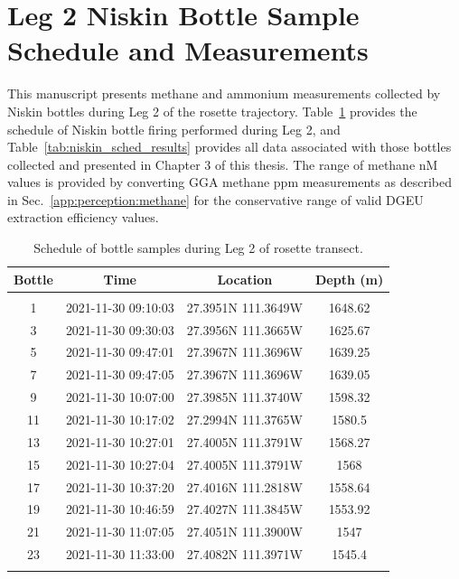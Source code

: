 \section{Leg 2 Niskin Bottle Sample Schedule and Measurements}
\label{app:perception:niskin}
This manuscript presents methane and ammonium measurements collected by Niskin bottles during Leg 2 of the rosette trajectory. Table~\ref{tab:niskin_sched} provides the schedule of Niskin bottle firing performed during Leg 2, and Table~\ref{tab:niskin_sched_results} provides all data associated with those bottles collected and presented in Chapter 3 of this thesis. The range of methane nM values is provided by converting GGA methane ppm measurements as described in Sec.~\ref{app:perception:methane} for the conservative range of valid DGEU extraction efficiency values.
\begin{table}[h!]
    \centering
    \begin{tabular}{c|c|c|c}
        Bottle & Time & Location & Depth (m) \\
        \hline
        \hline
        &&&\\
        1 & 2021-11-30 09:10:03 & 27.3951N 111.3649W & 1648.62 \\
        3 & 2021-11-30 09:30:03 & 27.3956N 111.3665W & 1625.67 \\
        5 & 2021-11-30 09:47:01 & 27.3967N 111.3696W & 1639.25 \\
        7 & 2021-11-30 09:47:05 & 27.3967N 111.3696W & 1639.05 \\
        9 & 2021-11-30 10:07:00 & 27.3985N 111.3740W & 1598.32 \\
        11 & 2021-11-30 10:17:02 & 27.2994N 111.3765W & 1580.5 \\
        13 & 2021-11-30 10:27:01 & 27.4005N 111.3791W & 1568.27 \\
        15 & 2021-11-30 10:27:04 & 27.4005N 111.3791W & 1568 \\
        17 & 2021-11-30 10:37:20 & 27.4016N 111.2818W & 1558.64 \\
        19 & 2021-11-30 10:46:59 & 27.4027N 111.3845W & 1553.92 \\
        21 & 2021-11-30 11:07:05 & 27.4051N 111.3900W & 1547 \\
        23 & 2021-11-30 11:33:00 & 27.4082N 111.3971W & 1545.4 \\
        &&&
    \end{tabular}
    \caption{Schedule of bottle samples during Leg 2 of rosette transect.}
    \label{tab:niskin_sched}
\end{table}

